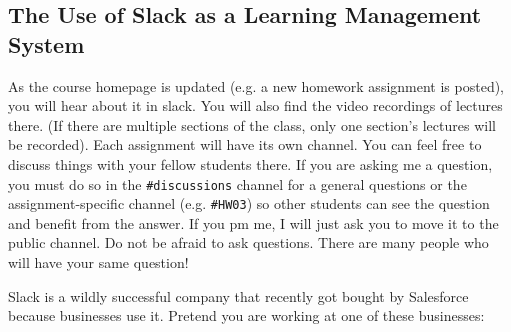 \subsection*{The Use of Slack as a Learning Management System}

As the course homepage is updated (e.g. a new homework assignment is posted), you will hear about it in slack. You will also find the video recordings of lectures there. (If there are multiple sections of the class, only one section's lectures will be recorded). Each assignment will have its own channel. You can feel free to discuss things with your fellow students there. If you are asking me a question, you must do so in the \texttt{\#discussions} channel for a general questions or the assignment-specific channel (e.g. \texttt{\#HW03}) so other students can see the question and benefit from the answer. If you pm me, I will just ask you to move it to the public channel. Do not be afraid to ask questions. There are many people who will have your same question! 

Slack is a wildly successful company that recently got bought by Salesforce because businesses use it. Pretend you are working at one of these businesses:  